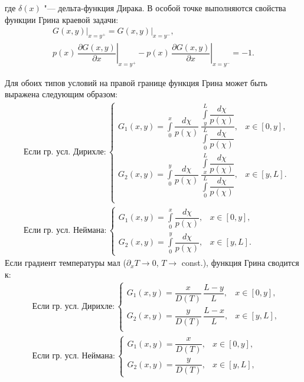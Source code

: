 где \( \delta(x) \) "--- дельта-функция Дирака. В особой точке выполняются свойства функции Грина краевой задачи:
\begin{gather}
	\label{eq:Green_problem_connect}
	 \left.G(x,y)\right\vert_{x=y^+}=\left.G(x,y)\right\vert_{x=y^-},                                                                                   \\
	 \left.p(x)\,\dfrac{\partial G(x,y)}{\partial x}\right\vert_{x=y^+}-\left.p(x)\,\dfrac{\partial G(x,y)}{\partial x}\right\vert_{x=y^-}=-1.\nonumber
\end{gather}

Для обоих типов условий на правой границе функция Грина может быть выражена следующим образом:
\begin{subequations}
	\label{eq:Green_solution}
	\begin{align}
		 & \text{Если гр. усл. Дирихле}:
		\begin{cases}
			G_1(x,y)=\int\limits_0^x\dfrac{d\chi}{p(\chi)}\,\dfrac{\int\limits_y^L\dfrac{d\chi}{p(\chi)}}{\int\limits_0^L\dfrac{d\chi}{p(\chi)}}, & x\in[0,y], \\[25pt]
			G_2(x,y)=\int\limits_0^y\dfrac{d\chi}{p(\chi)}\,\dfrac{\int\limits_x^L\dfrac{d\chi}{p(\chi)}}{\int\limits_0^L\dfrac{d\chi}{p(\chi)}}, & x\in[y,L]. \\
		\end{cases}\label{eq:Green_solution_D} \\[10pt]
		 & \text{Если гр. усл. Неймана}:
		\begin{cases}
			G_1(x,y)=\int\limits_0^x\dfrac{d\chi}{p(\chi)}, & x\in[0,y], \\[10pt]
			G_2(x,y)=\int\limits_0^y\dfrac{d\chi}{p(\chi)}, & x\in[y,L].
		\end{cases}\label{eq:Green_solution_N}
	\end{align}
\end{subequations}
Если градиент температуры мал ($\partial_x T \rightarrow 0$, $T \rightarrow$ const.), функция Грина сводится к:
\begin{subequations}
	\begin{align}
		 & \text{Если гр. усл. Дирихле}:
		\begin{cases}
			G_1(x,y)=\dfrac{x}{D(T)}\,\dfrac{L-y}{L}, & x\in[0,y], \\[25pt]
			G_2(x,y)=\dfrac{y}{D(T)}\,\dfrac{L-x}{L}, & x\in[y,L], \\
		\end{cases} \\[10pt]
		 & \text{Если гр. усл. Неймана}:
		\begin{cases}
			G_1(x,y)=\dfrac{x}{D(T)}, & x\in[0,y], \\[10pt]
			G_2(x,y)=\dfrac{y}{D(T)}, & x\in[y,L],
		\end{cases}
	\end{align}
\end{subequations}
